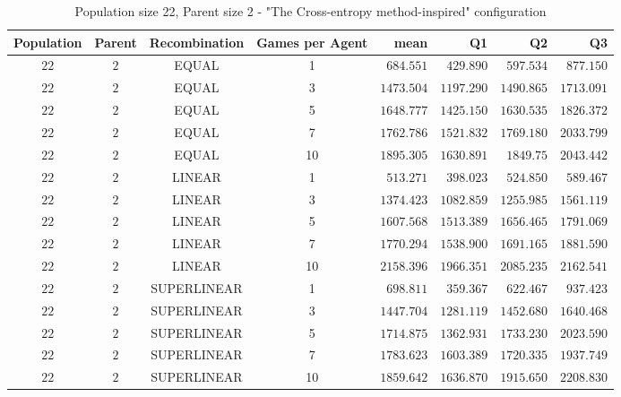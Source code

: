 \begin{table}[H]
\centering
\small
\begin{tabular}{c c c c r r r r}
Population & Parent & Recombination & Games per Agent & mean & Q1 & Q2 & Q3\\
\hline
$22$ & $2$ & EQUAL & 1 & $684.551$ & $429.890$ & $597.534$ & $877.150$\\
$22$ & $2$ & EQUAL & 3 & $1473.504$ & $1197.290$ & $1490.865$ & $1713.091$\\
$22$ & $2$ & EQUAL & 5 & $1648.777$ & $1425.150$ & $1630.535$ & $1826.372$\\
$22$ & $2$ & EQUAL & 7 & $1762.786$ & $1521.832$ & $1769.180$ & $2033.799$\\
\hdashline
$22$ & $2$ & EQUAL & 10 & $1895.305$ & $1630.891$ & $1849.75$ & $2043.442$\\
\hdashline
$22$ & $2$ & LINEAR & 1 & $513.271$ & $398.023$ & $524.850$ & $589.467$\\
$22$ & $2$ & LINEAR & 3 & $1374.423$ & $1082.859$ & $1255.985$ & $1561.119$\\
$22$ & $2$ & LINEAR & 5 & $1607.568$ & $1513.389$ & $1656.465$ & $1791.069$\\
$22$ & $2$ & LINEAR & 7 & $1770.294$ & $1538.900$ & $1691.165$ & $1881.590$\\
\hdashline
$22$ & $2$ & LINEAR & 10 & $2158.396$ & $1966.351$ & $2085.235$ & $2162.541$\\
\hdashline
$22$ & $2$ & SUPERLINEAR & 1 & $698.811$ & $359.367$ & $622.467$ & $937.423$\\
$22$ & $2$ & SUPERLINEAR & 3 & $1447.704$ & $1281.119$ & $1452.680$ & $1640.468$\\
$22$ & $2$ & SUPERLINEAR & 5 & $1714.875$ & $1362.931$ & $1733.230$ & $2023.590$\\
\hdashline
$22$ & $2$ & SUPERLINEAR & 7 & $1783.623$ & $1603.389$ & $1720.335$ & $1937.749$\\
\hdashline
$22$ & $2$ & SUPERLINEAR & 10 & $1859.642$ & $1636.870$ & $1915.650$ & $2208.830$\\
\end{tabular}
\caption{Population size 22, Parent size 2 - "The Cross-entropy method-inspired" configuration}
\end{table}


